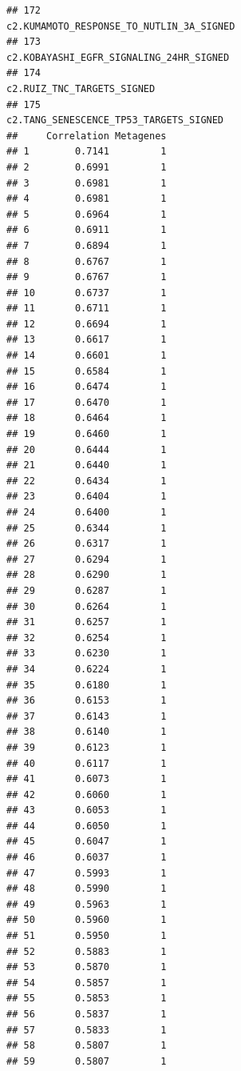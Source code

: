 \documentclass{article}\usepackage[]{graphicx}\usepackage[]{color}
\makeatletter
\newenvironment{kframe}{%
 \def\at@end@of@kframe{}%
 \ifinner\ifhmode%
  \def\at@end@of@kframe{\end{minipage}}%
  \begin{minipage}{\columnwidth}%
 \fi\fi%
 \def\FrameCommand##1{\hskip\@totalleftmargin \hskip-\fboxsep
 \colorbox{shadecolor}{##1}\hskip-\fboxsep
     \hskip-\linewidth \hskip-\@totalleftmargin \hskip\columnwidth}%
 \MakeFramed {\advance\hsize-\width
   \@totalleftmargin\z@ \linewidth\hsize
   \@setminipage}}%
 {\par\unskip\endMakeFramed%
 \at@end@of@kframe}
\newenvironment{knitrout}{}{} %
\makeatother
\begin{document}
\begin{knitrout}
\begin{kframe}
\begin{verbatim}
## 172                                                                                                                                                                         c2.KUMAMOTO_RESPONSE_TO_NUTLIN_3A_SIGNED
## 173                                                                                                                                                                          c2.KOBAYASHI_EGFR_SIGNALING_24HR_SIGNED
## 174                                                                                                                                                                                       c2.RUIZ_TNC_TARGETS_SIGNED
## 175                                                                                                                                                                           c2.TANG_SENESCENCE_TP53_TARGETS_SIGNED
##     Correlation Metagenes
## 1        0.7141         1
## 2        0.6991         1
## 3        0.6981         1
## 4        0.6981         1
## 5        0.6964         1
## 6        0.6911         1
## 7        0.6894         1
## 8        0.6767         1
## 9        0.6767         1
## 10       0.6737         1
## 11       0.6711         1
## 12       0.6694         1
## 13       0.6617         1
## 14       0.6601         1
## 15       0.6584         1
## 16       0.6474         1
## 17       0.6470         1
## 18       0.6464         1
## 19       0.6460         1
## 20       0.6444         1
## 21       0.6440         1
## 22       0.6434         1
## 23       0.6404         1
## 24       0.6400         1
## 25       0.6344         1
## 26       0.6317         1
## 27       0.6294         1
## 28       0.6290         1
## 29       0.6287         1
## 30       0.6264         1
## 31       0.6257         1
## 32       0.6254         1
## 33       0.6230         1
## 34       0.6224         1
## 35       0.6180         1
## 36       0.6153         1
## 37       0.6143         1
## 38       0.6140         1
## 39       0.6123         1
## 40       0.6117         1
## 41       0.6073         1
## 42       0.6060         1
## 43       0.6053         1
## 44       0.6050         1
## 45       0.6047         1
## 46       0.6037         1
## 47       0.5993         1
## 48       0.5990         1
## 49       0.5963         1
## 50       0.5960         1
## 51       0.5950         1
## 52       0.5883         1
## 53       0.5870         1
## 54       0.5857         1
## 55       0.5853         1
## 56       0.5837         1
## 57       0.5833         1
## 58       0.5807         1
## 59       0.5807         1

\end{verbatim}
\end{kframe}
\end{knitrout}
\end{document}
